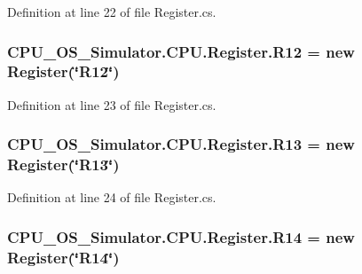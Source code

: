 Definition at line 22 of file Register.\+cs.

\hypertarget{class_c_p_u___o_s___simulator_1_1_c_p_u_1_1_register_abb2b38dad72e0b3e97fcf7e09a0bf1f9}{}
\subsubsection[{R12}]{ C\+P\+U\+\_\+\+O\+S\+\_\+\+Simulator.\+C\+P\+U.\+Register.\+R12 = new {\bf Register}(\char`\"{}R12\char`\"{})\hspace{0.3cm}{\ttfamily [static]}}\label{class_c_p_u___o_s___simulator_1_1_c_p_u_1_1_register_abb2b38dad72e0b3e97fcf7e09a0bf1f9}


Definition at line 23 of file Register.\+cs.

\hypertarget{class_c_p_u___o_s___simulator_1_1_c_p_u_1_1_register_adb4ed15863b50ae94a10416d9fc35a34}{}
\subsubsection[{R13}]{ C\+P\+U\+\_\+\+O\+S\+\_\+\+Simulator.\+C\+P\+U.\+Register.\+R13 = new {\bf Register}(\char`\"{}R13\char`\"{})\hspace{0.3cm}{\ttfamily [static]}}\label{class_c_p_u___o_s___simulator_1_1_c_p_u_1_1_register_adb4ed15863b50ae94a10416d9fc35a34}


Definition at line 24 of file Register.\+cs.

\hypertarget{class_c_p_u___o_s___simulator_1_1_c_p_u_1_1_register_ad2c93dc9788349569aac3a5ba60f7581}{}
\subsubsection[{R14}]{ C\+P\+U\+\_\+\+O\+S\+\_\+\+Simulator.\+C\+P\+U.\+Register.\+R14 = new {\bf Register}(\char`\"{}R14\char`\"{})\hspace{0.3cm}{\ttfamily [static]}}\label{class_c_p_u___o_s___simulator_1_1_c_p_u_1_1_register_ad2c93dc9788349569aac3a5ba60f7581}


